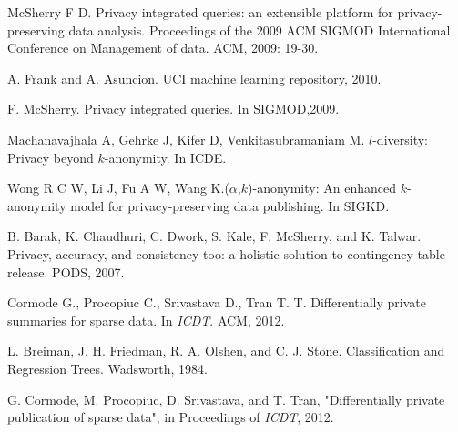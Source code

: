 \begin{thebibliography}{1}
McSherry F D. Privacy integrated queries: an extensible platform for privacy-preserving data analysis. Proceedings of the 2009 ACM SIGMOD International Conference on Management of data. ACM, 2009: 19-30.

A. Frank and A. Asuncion. UCI machine learning repository, 2010.




F. McSherry. Privacy integrated queries. In SIGMOD,2009.

 Machanavajhala A, Gehrke J, Kifer D, Venkitasubramaniam M. $l$-diversity: Privacy beyond $k$-anonymity. In ICDE.


 Wong R C W, Li J, Fu A W, Wang K.($\alpha$,$k$)-anonymity: An enhanced $k$-anonymity model for privacy-preserving data publishing. In SIGKD.





B. Barak, K. Chaudhuri, C. Dwork, S. Kale, F. McSherry, and K. Talwar. Privacy, accuracy, and consistency too: a holistic solution to contingency table release. PODS, 2007.





Cormode G., Procopiuc C., Srivastava D., Tran T. T. Differentially private summaries for sparse data. In {\it ICDT}. ACM, 2012.










 L. Breiman, J. H. Friedman, R. A. Olshen, and C. J. Stone. Classification and Regression Trees. Wadsworth, 1984.

G. Cormode, M. Procopiuc, D. Srivastava, and T. Tran, "Differentially
private publication of sparse data", in Proceedings of {\it ICDT}, 2012.

\end{thebibliography}